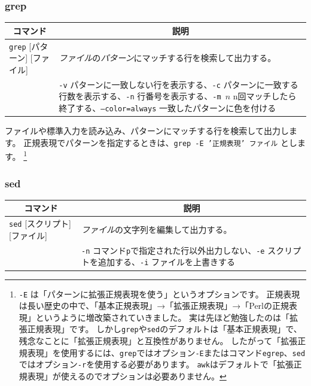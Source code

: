 \documentclass[a4j]{ltjsreport}
\begin{document}
    \subsubsection{grep}

    \begin{longtable}[c]{|p{3.5cm}|p{13.5cm}|}
        \hline
        \multicolumn{1}{|c|}{\textbf{コマンド}}&\multicolumn{1}{|c|}{\textbf{説明}}\\
        \hline\hline
        \texttt{grep} {\footnotesize [パターン] [ファイル]}  &\emph{ファイル}の\emph{パターン}にマッチする行を検索して出力する。\\
        & \texttt{-v} パターンに一致しない行を表示する、\texttt{-c} パターンに一致する行数を表示する、\texttt{-n} 行番号を表示する、\texttt{-m $n$} n回マッチしたら終了する、\texttt{--color=always} 一致したパターンに色を付ける \\
        \hline
    \end{longtable}

    ファイルや標準入力を読み込み、パターンにマッチする行を検索して出力します。
    正規表現でパターンを指定するときは、\texttt{grep -E '正規表現' ファイル} とします。
    \footnote{\texttt{-E} は「パターンに拡張正規表現を使う」というオプションです。
    正規表現は長い歴史の中で、「基本正規表現」→「拡張正規表現」→「Perlの正規表現」というように増改築されていきました。
    実は先ほど勉強したのは「拡張正規表現」です。
    しかし\texttt{grep}や\texttt{sed}のデフォルトは「基本正規表現」で、残念なことに「拡張正規表現」と互換性がありません。
    したがって「拡張正規表現」を使用するには、\texttt{grep}ではオプション\texttt{-E}またはコマンド\texttt{egrep}、\texttt{sed}ではオプション\texttt{-r}を使用する必要があります。
    \texttt{awk}はデフォルトで「拡張正規表現」が使えるのでオプションは必要ありません。}

    \subsubsection{sed} 

    \begin{longtable}[c]{|p{3.5cm}|p{13.5cm}|}
        \hline
        \multicolumn{1}{|c|}{\textbf{コマンド}}&\multicolumn{1}{|c|}{\textbf{説明}}\\
        \hline\hline
        \texttt{sed} {\footnotesize [スクリプト] [ファイル]}   &\emph{ファイル}の文字列を編集して出力する。\\
        & \texttt{-n} コマンド\texttt{p}で指定された行以外出力しない、\texttt{-e} スクリプトを追加する、\texttt{-i} ファイルを上書きする \\
        \hline
    \end{longtable}
\end{document}
